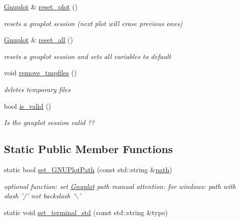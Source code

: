 \begin{DoxyCompactItemize}
\hyperlink{classGnuplot}{\-Gnuplot} \& \hyperlink{classGnuplot_a6797761712d3c311e3685bcccba65dd4}{reset\-\_\-plot} ()
\begin{DoxyCompactList}\small\item\em resets a gnuplot session (next plot will erase previous ones) \end{DoxyCompactList}\item 
\hyperlink{classGnuplot}{\-Gnuplot} \& \hyperlink{classGnuplot_a9aedfe8371083a1a3ac2b9493810049c}{reset\-\_\-all} ()
\begin{DoxyCompactList}\small\item\em resets a gnuplot session and sets all variables to default \end{DoxyCompactList}\item 
void \hyperlink{classGnuplot_a2e449552587b0055f40f4ee079d62a8d}{remove\-\_\-tmpfiles} ()
\begin{DoxyCompactList}\small\item\em deletes temporary files \end{DoxyCompactList}\item 
bool \hyperlink{classGnuplot_a3135ffebb308b50c4f3178a62b23ab03}{is\-\_\-valid} ()
\begin{DoxyCompactList}\small\item\em \-Is the gnuplot session valid ?? \end{DoxyCompactList}\end{DoxyCompactItemize}
\subsection*{\-Static \-Public \-Member \-Functions}
\begin{DoxyCompactItemize}
\item 
static bool \hyperlink{classGnuplot_a67cae885c26ced821e335d98986f1967}{set\-\_\-\-G\-N\-U\-Plot\-Path} (const std\-::string \&\hyperlink{fri__make_8m_a919ec23156d81a01689d30e1f3ecf261}{path})
\begin{DoxyCompactList}\small\item\em optional function\-: set \hyperlink{classGnuplot}{\-Gnuplot} path manual attention\-: for windows\-: path with slash '/' not backslash '$\backslash$' \end{DoxyCompactList}\item 
static void \hyperlink{classGnuplot_a21feba7a3916708b742c3dc25850ab2f}{set\-\_\-terminal\-\_\-std} (const std\-::string \&type)
\end{DoxyCompactItemize}


